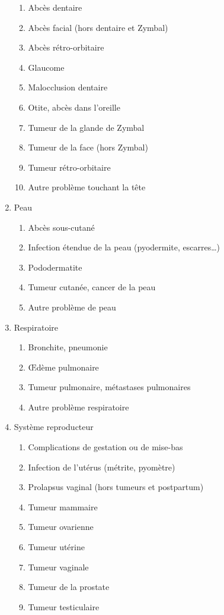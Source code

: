 ﻿\documentclass[a4paper,10pt]{article}
\begin{document}
\begin{enumerate}
\begin{enumerate}
\item Abcès dentaire
\item Abcès facial (hors dentaire et Zymbal)
\item Abcès rétro-orbitaire
\item Glaucome
\item Malocclusion dentaire
\item Otite, abcès dans l'oreille
\item Tumeur de la glande de Zymbal
\item Tumeur de la face (hors Zymbal)
\item Tumeur rétro-orbitaire
\item Autre problème touchant la tête
\end{enumerate}
\item Peau
\begin{enumerate}
\item Abcès sous-cutané
\item Infection étendue de la peau (pyodermite, escarres…)
\item Pododermatite
\item Tumeur cutanée, cancer de la peau
\item Autre problème de peau
\end{enumerate}
\item Respiratoire
\begin{enumerate}
\item Bronchite, pneumonie
\item Œdème pulmonaire
\item Tumeur pulmonaire, métastases pulmonaires
\item Autre problème respiratoire
\end{enumerate}
\item Système reproducteur
\begin{enumerate}
\item Complications de gestation ou de mise-bas
\item Infection de l'utérus (métrite, pyomètre)
\item Prolapsus vaginal (hors tumeurs et postpartum)
\item Tumeur mammaire
\item Tumeur ovarienne
\item Tumeur utérine
\item Tumeur vaginale
\item Tumeur de la prostate
\item Tumeur testiculaire

\end{enumerate}
\end{enumerate}
\end{document}
